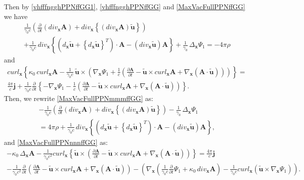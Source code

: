 \documentclass{article}
\theoremstyle{definition}
\theoremstyle{remark}
\renewcommand{\vec}[1]{\mathbf{#1}}
\newcommand{\er}{\eqref}
\newcommand{\er}{\eqref}
\begin{document}
Then by \er{vhfffngghPPNffGG1}, \er{vhfffngghPPNffGG} and
\er{MaxVacFullPPNffGG} we have
\begin{multline}\label{MaxVacFullPPNmmmffGG}
\frac{1}{\gamma_0 c}\left(\frac{\partial}{\partial t}\left(div_{\vec
x}\vec A\right)+div_{\vec x} \left\{\left(div_{\vec x}\vec
A\right)\vec {\tilde u}\right\}\right)\\+\frac{1}{\gamma_0
c}\,div_{\vec x} \left\{\left(d_{\vec x}\vec {\tilde
u}+\left\{d_{\vec x}\vec {\tilde u}\right\}^T\right)\cdot\vec
A-\left(div_{\vec x}\vec {\tilde u}\right)\vec
A\right\}+\frac{1}{\gamma_0}\,\Delta_{\vec x}\Psi_1=-4\pi\rho
\end{multline}
and
\begin{multline}\label{MaxVacFullPPNnnnffGG}
curl_{\vec x} \left\{\kappa_0\,curl_{\vec x} \vec
A-\frac{1}{\gamma_0 c}\,\vec {\tilde u}\times
\left(\nabla_{\vec x}\Psi_1+\frac{1}{c}\left(\frac{\partial\vec
A}{\partial t}-\vec {\tilde u}\times curl_{\vec x}\vec
A+\nabla_{\vec x}\left(\vec A\cdot\vec {\tilde
u}\right)\right)\right)\right\}=\\
\frac{4\pi}{c}\vec j+\frac{1}{\gamma_0 c}\frac{\partial}{\partial
t}\left\{-\nabla_{\vec x}\Psi_1-\frac{1}{c}\left(\frac{\partial\vec
A}{\partial t}-\vec {\tilde u}\times curl_{\vec x}\vec
A+\nabla_{\vec x}\left(\vec A\cdot\vec {\tilde
u}\right)\right)\right\}.
\end{multline}
Then, we rewrite \er{MaxVacFullPPNmmmffGG} as:
\begin{multline}\label{MaxVacFullPPNmmmffffffhhGG}
-\frac{1}{\gamma_0 c}\left(\frac{\partial}{\partial
t}\left(div_{\vec x}\vec A\right)+div_{\vec x}
\left\{\left(div_{\vec x}\vec A\right)\vec {\tilde
u}\right\}\right)-\frac{1}{\gamma_0}\,\Delta_{\vec
x}\Psi_1\\=4\pi\rho+\frac{1}{\gamma_0 c}\,div_{\vec x}
\left\{\left(d_{\vec x}\vec {\tilde u}+\left\{d_{\vec x}\vec {\tilde
u}\right\}^T\right)\cdot\vec A-\left(div_{\vec x}\vec {\tilde
u}\right)\vec A\right\},
\end{multline}
and \er{MaxVacFullPPNnnnffGG} as:
\begin{multline}\label{MaxVacFullPPNnnnffffffhhGG}
-\kappa_0\,\Delta_{\vec x}\vec A-\frac{1}{\gamma_0 c^2}curl_{\vec x}
\left\{\vec {\tilde u}\times
\left(\frac{\partial\vec A}{\partial t}-\vec {\tilde u}\times
curl_{\vec x}\vec A+\nabla_{\vec x}\left(\vec A\cdot\vec {\tilde
u}\right)\right)\right\}= \frac{4\pi}{c}\vec j\\-\frac{1}{\gamma_0
c^2}\frac{\partial}{\partial t}\left(\frac{\partial\vec A}{\partial
t}-\vec {\tilde u}\times curl_{\vec x}\vec A+\nabla_{\vec
x}\left(\vec A\cdot\vec {\tilde u}\right)\right)-\left(\nabla_{\vec
x}\left(\frac{1}{\gamma_0 c}\frac{\partial}{\partial
t}\Psi_1+\kappa_0\,div_{\vec x} \vec A\right)-\frac{1}{\gamma_0
c}curl_{\vec x} \left(\vec {\tilde u}\times
\nabla_{\vec x}\Psi_1\right)\right).
\end{multline}
\end{document}
